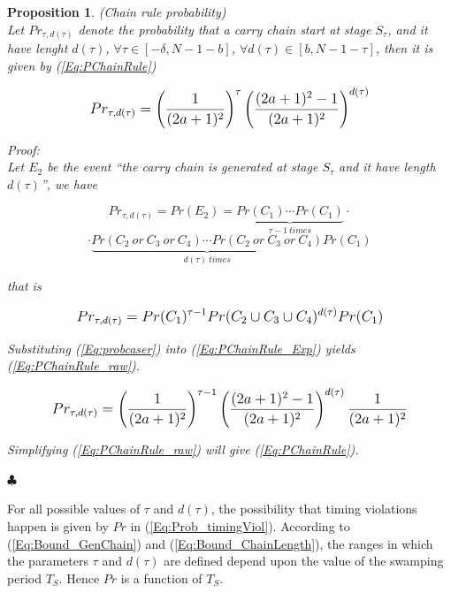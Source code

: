 \documentclass[journal]{IEEEtran}
\newtheorem{proposition}{Proposition}[section]
\begin{document}
\begin{proposition} (Chain rule probability)\\
Let $Pr_{\tau,d(\tau )}$ denote the probability that a carry chain start at stage $S_{\tau}$, and it have lenght $d(\tau )$, $\forall \tau \in [-\delta , N-1-b]$, $\forall d(\tau) \in [b , N-1-\tau]$, then it is given by (\ref{Eq:PChainRule})

\begin{equation}\label{Eq:PChainRule}
\footnotesize
Pr_{\tau,d(\tau )} =\left(\frac{1}{(2a+1)^2}\right)^\tau \left(\frac{(2a+1)^2-1}{(2a+1)^2}\right)^{d(\tau )}
\normalsize
\end{equation}

\noindent Proof:\\

Let $E_2$ be the event ``the carry chain is generated at stage $S_{\tau}$ and it have length $d(\tau )$'', we have

\begin{equation}
Pr_{\tau,d(\tau )} = Pr(E_2)=  \underbrace{Pr(C_1)\cdots  Pr(C_1)}_{\tau -1 \ times}\cdot
\end{equation}
$$
\cdot  \underbrace{ Pr(C_2 \ or \ C_3   \ or \ C_4)\cdots Pr(C_2  \ or \   C_3   \ or \   C_4)}_{d(\tau) \  times}   Pr(C_1)$$

that is

\begin{equation}\label{Eq:PChainRule_Exp}
\scriptsize
Pr_{\tau,d(\tau )} = Pr(C_1)^{\tau -1} Pr(C_2 \cup C_3 \cup C_4)^{d(\tau )} Pr(C_1)
\normalsize
\end{equation}

Substituting (\ref{Eq:probcaser}) into (\ref{Eq:PChainRule_Exp}) yields (\ref{Eq:PChainRule_raw}).

\begin{equation}\label{Eq:PChainRule_raw}
\footnotesize
  Pr_{\tau,d(\tau )}= \left(\frac{1}{(2a+1)^2}\right)^{\tau -1} \left(\frac{(2a+1)^2-1}{(2a+1)^2}\right)^{d(\tau )} \frac{1}{(2a+1)^2}
\normalsize
\end{equation}

Simplifying (\ref{Eq:PChainRule_raw}) will give (\ref{Eq:PChainRule}).

\hspace{7cm} $\clubsuit$
\vspace{1ex}

\end{proposition}

For all possible values of $\tau$ and $d(\tau)$, the possibility that timing violations happen is given by $Pr$ in (\ref{Eq:Prob_timingViol}). According to (\ref{Eq:Bound_GenChain}) and (\ref{Eq:Bound_ChainLength}), the ranges in which the parameters $\tau$ and $d(\tau)$ are defined depend upon the value of the swamping period $T_S$. Hence $Pr$ is a function of $T_S$.
\end{document}
